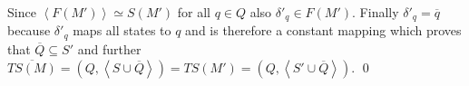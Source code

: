 \documentclass[a4paper,12pt,numbers=noenddot]{scrreport}
\def\lsk{\left<}
\def\rsk{\right>}
\begin{document}
Since $\lsk F(M') \rsk \simeq S(M')$ for all $q \in Q$ also $\delta'_q \in F(M')$.
Finally $\delta'_q = \overline{q}$ because $\delta'_q$ maps all states to $q$ and is therefore a constant mapping which proves that $\overline{Q} \subseteq S'$ and further $\overline{TS(M)}=(Q,\lsk S \cup \overline{Q} \rsk)=TS(M')=(Q,\lsk S' \cup \overline{Q} \rsk)$.
\qed
\section{}
\section{}
\end{document}
